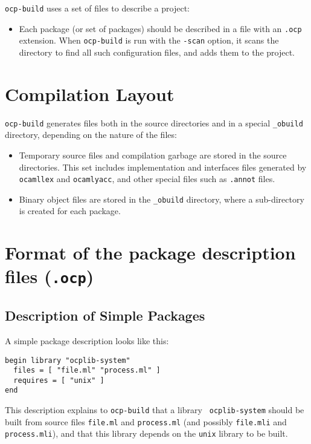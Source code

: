  {\tt ocp-build} uses a set of files to describe a project:
\begin{itemize}
\item Each package (or set of packages) should be described in a file
  with an {\tt .ocp} extension. When {\tt ocp-build} is run with the
  {\tt -scan} option, it scans the directory to find all such
  configuration files, and adds them to the project.
\end{itemize}

\section{Compilation Layout}

{\tt ocp-build} generates files both in the source directories and in
a special {\tt \_obuild} directory, depending on the nature of the
files:
\begin{itemize}
\item Temporary source files and compilation garbage are stored in the
  source directories. This set includes implementation and interfaces
  files generated by {\tt ocamllex} and {\tt ocamlyacc}, and other
  special files such as {\tt .annot} files.
\item Binary object files are stored in the {\tt \_obuild} directory,
  where a sub-directory is created for each package.
\end{itemize}

\section{Format of the package description files ({\tt .ocp})}

\subsection{Description of Simple Packages}

A simple package description looks like this:

\begin{verbatim}
begin library "ocplib-system"
  files = [ "file.ml" "process.ml" ]
  requires = [ "unix" ]
end
\end{verbatim}

This description explains to {\tt ocp-build} that a library {\tt
  ocplib-system} should be built from source files {\tt file.ml} and
{\tt process.ml} (and possibly {\tt file.mli} and {\tt process.mli}),
and that this library depends on the {\tt unix} library to be built.

